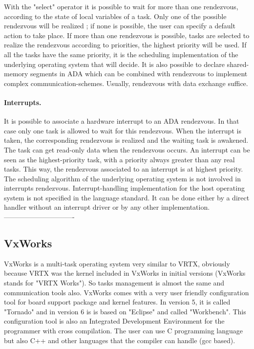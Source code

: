 \documentclass[10pt]{report}
\begin{document}
With the "select" operator it is possible to wait for more than one rendezvous, according to the state of local variables of a task.
Only one of the possible rendezvous will be realized ; if none is possible, the user can specify a default action to take place. If more than
one rendezvous is possible, tasks are selected to realize the rendezvous according to priorities, the highest priority will be
used. If all the tasks have the same priority, it is the scheduling implementation of the underlying operating system
that will decide. It is also possible to declare shared-memory segments in ADA which can be combined with rendezvous to
implement complex communication-schemes. Usually, rendezvous with data exchange suffice.

\paragraph{Interrupts.} It is possible to associate a hardware interrupt to an ADA rendezvous. In that case only one task is allowed
to wait for this rendezvous. When the interrupt is taken, the corresponding rendezvous is realized and the waiting
task is awakened. The task can get read-only data when the rendezvous occurs. An interrupt can be seen as the highest-priority 
task, with a priority always greater than any real tasks. This way, the rendezvous associated to an interrupt is at highest priority.
The scheduling algorithm of the underlying operating system is not involved in interrupts rendezvous. Interrupt-handling
implementation for the host operating system is not specified in the language standard. It can be done either by a direct handler without
an interrupt driver or by any other implementation.
-------------------------------

\subsection{VxWorks}

VxWorks is a multi-task operating system very similar to VRTX, obviously because VRTX was the kernel included in VxWorks in
initial versions (VxWorks stands for "VRTX Works"). So tasks management is almost the same and communication tools also.
VxWorks comes with a very user friendly configuration tool for board support package and kernel features. In version 5, it is
called "Tornado" and in version 6 is is based on "Eclipse" and called "Workbench". This configuration tool is also an
Integrated Development Environment for the programmer with cross compilation. The user can use C programming language but also
C++ and other languages that the compiler can handle (gcc based).
\end{document}
